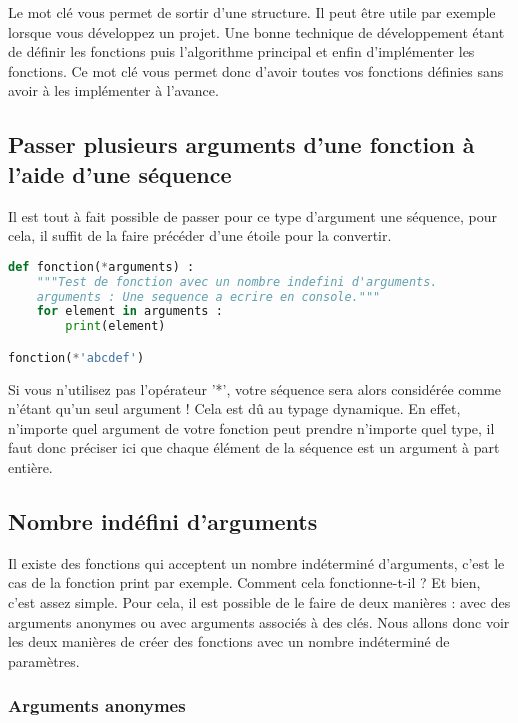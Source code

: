\documentclass[a4paper,twoside]{article}
\begin{document}
\begin{remarque}
Le mot clé  vous permet de sortir d'une structure. Il peut être utile par exemple lorsque vous développez un projet. Une bonne technique de développement étant de définir les fonctions puis l'algorithme principal et enfin d'implémenter les fonctions. Ce mot clé vous permet donc d'avoir toutes vos fonctions définies sans avoir à les implémenter à l'avance.
\end{remarque}

\subsection{Passer plusieurs arguments d'une fonction à l'aide d'une séquence}\label{sec:args_liste}
Il est tout à fait possible de passer pour ce type d'argument une séquence, pour cela, il suffit de la faire précéder d'une étoile pour la convertir.

\begin{lstlisting}[language=python]
def fonction(*arguments) :
    """Test de fonction avec un nombre indefini d'arguments.
    arguments : Une sequence a ecrire en console."""
    for element in arguments :
        print(element)

fonction(*'abcdef')
\end{lstlisting}

Si vous n'utilisez pas l'opérateur '*', votre séquence sera alors considérée comme n'étant qu'un seul argument ! Cela est dû au typage dynamique. En effet, n'importe quel argument de votre fonction peut prendre n'importe quel type, il faut donc préciser ici que chaque élément de la séquence est un argument à part entière.

\subsection{Nombre indéfini d'arguments}

Il existe des fonctions qui acceptent un nombre indéterminé d'arguments, c'est le cas de la fonction print par exemple. Comment cela fonctionne-t-il ? Et bien, c'est assez simple. Pour cela, il est possible de le faire de deux manières : avec des arguments anonymes ou avec arguments associés à des clés. Nous allons donc voir les deux manières de créer des fonctions avec un nombre indéterminé de paramètres.

\subsubsection{Arguments anonymes}
\end{document}
